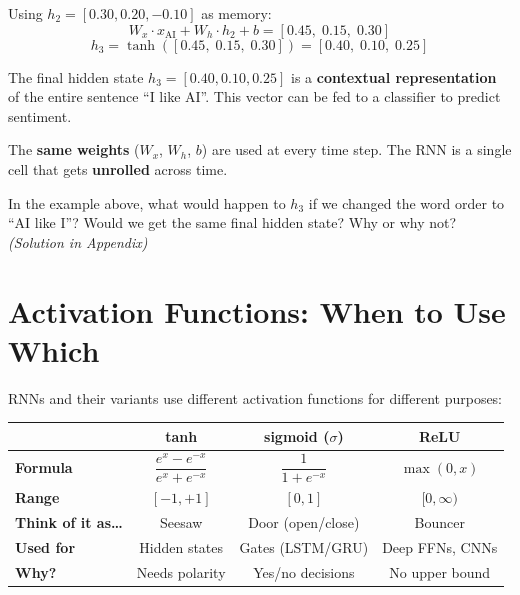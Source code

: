 \documentclass[11pt,a4paper]{article}
\begin{document}
\begin{tcolorbox}[colback=white, colframe=alfaisalgreen, boxrule=0.5pt, title={\textbf{Step 3 --- Processing ``AI''}}]
Using $h_2 = [0.30, 0.20, -0.10]$ as memory:
\[
W_x \cdot x_{\text{AI}} + W_h \cdot h_2 + b = [0.45,\; 0.15,\; 0.30]
\]
\[
h_3 = \tanh([0.45,\; 0.15,\; 0.30]) = [0.40,\; 0.10,\; 0.25]
\]
\end{tcolorbox}

The final hidden state $h_3 = [0.40, 0.10, 0.25]$ is a \textbf{contextual representation} of the entire sentence ``I like AI''. This vector can be fed to a classifier to predict sentiment.

\begin{tcolorbox}[warnbox={Key Point}]
The \textbf{same weights} ($W_x$, $W_h$, $b$) are used at every time step. The RNN is a single cell that gets \textbf{unrolled} across time.
\end{tcolorbox}

\begin{tcolorbox}[questionbox={Self-Check Q2}]
In the example above, what would happen to $h_3$ if we changed the word order to ``AI like I''? Would we get the same final hidden state? Why or why not? \textit{(Solution in Appendix)}
\end{tcolorbox}

\section{Activation Functions: When to Use Which}

RNNs and their variants use different activation functions for different purposes:

\begin{center}
\renewcommand{\arraystretch}{1.4}
\begin{tabular}{@{}p{2.5cm}ccc@{}}
\toprule
& \textbf{tanh} & \textbf{sigmoid} ($\sigma$) & \textbf{ReLU} \\
\midrule
\textbf{Formula} & $\dfrac{e^x - e^{-x}}{e^x + e^{-x}}$ & $\dfrac{1}{1 + e^{-x}}$ & $\max(0, x)$ \\[8pt]
\textbf{Range} & $[-1, +1]$ & $[0, 1]$ & $[0, \infty)$ \\[4pt]
\textbf{Think of it as\ldots} & Seesaw & Door (open/close) & Bouncer \\[4pt]
\textbf{Used for} & Hidden states & Gates (LSTM/GRU) & Deep FFNs, CNNs \\[4pt]
\textbf{Why?} & Needs polarity & Yes/no decisions & No upper bound \\
\bottomrule
\end{tabular}
\end{center}
\end{document}
